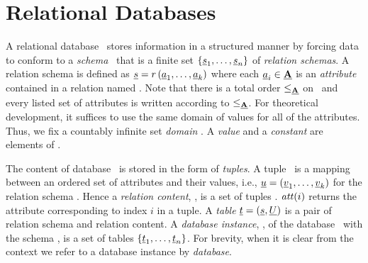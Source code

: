 \section{Relational Databases}
\label{sec:rdb}


A relational database \pDB\ stores information in a structured manner by forcing
data to conform to a \emph{schema} \pSch\ that is a finite set 
$\setDef {{\pRelSch}_1, \ldots, {\pRelSch}_n}$ of \emph{relation schemas}.
A relation schema is defined as
$\pRelSch = \vRel \paran {\vi \pAtt k}$ where each $\pAtt_i \in \pAttSet$ is an
\emph{attribute} contained in a relation named \vRel. 
Note that there is a
total order $\leq_{\pAttSet}$ on \pAttSet\ and every listed set of attributes is written according
to $\leq_{\pAttSet}$.
For theoretical development, it suffices to use the same domain of values
for all of the attributes. Thus, we fix a countably infinite set \emph{domain} \domSet.
A \emph{value} and a \emph{constant} are elements of \domSet.



The content of database \pDB\ is stored in the form of \emph{tuples}. A tuple \pTuple\
is a mapping between an ordered set of attributes and their values,
i.e.,
$\pTuple = \paran {\vi {\underline v} k}$ for the relation schema \vRel {}.
Hence a \emph{relation content}, \pRelCont, is a set of tuples \setDef {\vi \pTuple m}.
$\getAtt {i}$ returns the attribute corresponding to
index $i$ in a tuple.
A \emph{table} \ensuremath{\pTab = \left(\pRelSch, \pRelCont\right)} is a pair of relation schema and relation content.
A \emph{database instance}, \pInst, of the database \pDB\ with the
schema \pSch, is a set of tables $\setDef {\pTab_1, \ldots, \pTab_n}$.
For brevity, when it is clear from the context we refer to a database instance
by \emph{database}.


